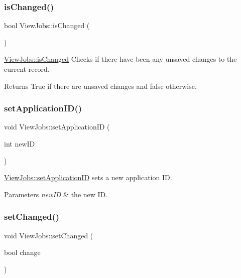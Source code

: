 \subsubsection{\texorpdfstring{is\+Changed()}{isChanged()}}
{\footnotesize\ttfamily bool View\+Jobs\+::is\+Changed (\begin{DoxyParamCaption}{ }\end{DoxyParamCaption})}



\hyperlink{class_view_jobs_a5f75b45d28ce7f4a8050ce9ce0f44350}{View\+Jobs\+::is\+Changed} Checks if there have been any unsaved changes to the current record. 

\begin{DoxyReturn}{Returns}
True if there are unsaved changes and false otherwise. 
\end{DoxyReturn}
\mbox{\label{class_view_jobs_acd43a8c32ab9bca7e40ecc99e51da9b8}} 
\subsubsection{\texorpdfstring{set\+Application\+I\+D()}{setApplicationID()}}
{\footnotesize\ttfamily void View\+Jobs\+::set\+Application\+ID (\begin{DoxyParamCaption}\item[{int}]{new\+ID }\end{DoxyParamCaption})}



\hyperlink{class_view_jobs_acd43a8c32ab9bca7e40ecc99e51da9b8}{View\+Jobs\+::set\+Application\+ID} sets a new application ID. 


\begin{DoxyParams}{Parameters}
{\em new\+ID} & the new ID. \\
\hline
\end{DoxyParams}
\mbox{\label{class_view_jobs_a3cba868c6deadaf4b35c18982f7ec35e}} 
\subsubsection{\texorpdfstring{set\+Changed()}{setChanged()}}
{\footnotesize\ttfamily void View\+Jobs\+::set\+Changed (\begin{DoxyParamCaption}\item[{bool}]{change }\end{DoxyParamCaption})}



